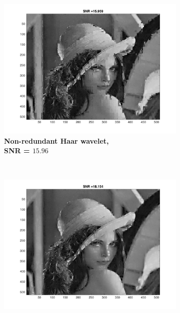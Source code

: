 \begin{figure}
    \centering
    \begin{subfigure}[b]{0.45\textwidth}
        \includegraphics[width=\textwidth]{../src/inpainting/vraag_2_3_wt_haar}
        \caption{\textbf{Non-redundant Haar wavelet, \\ SNR = $\mathbf{15.96}$} }
        \label{fig:matti_fig_wt_haar}
    \end{subfigure}
    ~ %
    \begin{subfigure}[b]{0.45\textwidth}
        \includegraphics[width=\textwidth]{../src/inpainting/vraag_2_3_rwt_haar}

\end{subfigure}
\end{figure}
